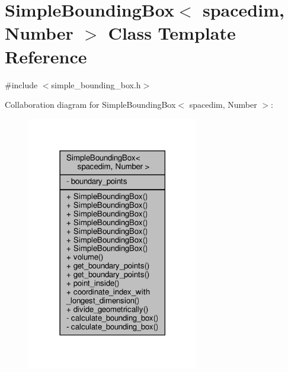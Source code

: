 \hypertarget{classSimpleBoundingBox}{}\section{Simple\+Bounding\+Box$<$ spacedim, Number $>$ Class Template Reference}
\label{classSimpleBoundingBox}


{\ttfamily \#include $<$simple\+\_\+bounding\+\_\+box.\+h$>$}



Collaboration diagram for Simple\+Bounding\+Box$<$ spacedim, Number $>$\+:\nopagebreak
\begin{figure}[H]
\begin{center}
\leavevmode
\includegraphics[width=213pt]{classSimpleBoundingBox__coll__graph}
\end{center}
\end{figure}
